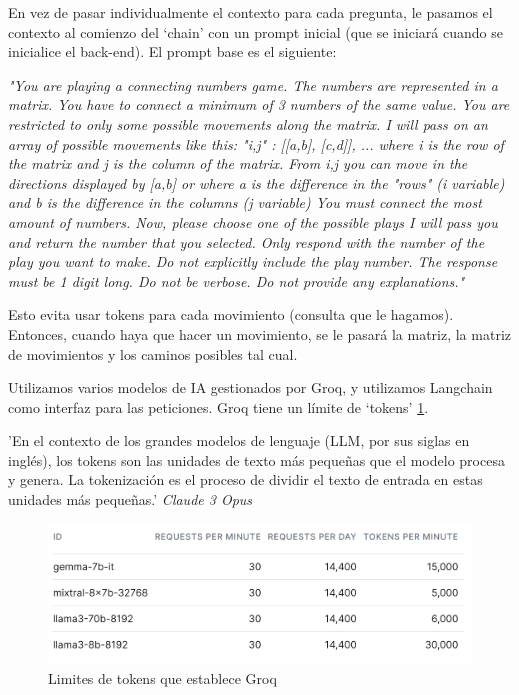 \documentclass[12pt,epsf,titlepage,a4paper]{article}
\begin{document}
En vez de pasar individualmente el contexto para cada pregunta, le pasamos el contexto al comienzo del ‘chain’ con un prompt inicial (que se iniciará cuando se inicialice el back-end). El prompt base es el siguiente:
\vspace{5mm}


\textit{"You are playing a connecting numbers game. The numbers are represented in a matrix.
You have to connect a minimum of 3 numbers of the same value.
You are restricted to only some possible movements along the matrix. 
I will pass on an array of possible movements like this: "i,j" : [[a,b], [c,d]], ... where i is the row of the matrix and j is the column of the matrix. From i,j you can move in the directions displayed by [a,b] or where a is the difference in the "rows" (i variable) and b is the difference in the columns (j variable)  
You must connect the most amount of numbers.
Now, please choose one of the possible plays I will pass you and return the number that you selected. 
Only respond with the number of the play you want to make. 
Do not explicitly include the play number. 
The response must be 1 digit long. 
Do not be verbose. 
Do not provide any explanations."}
\vspace{5mm}


Esto evita usar tokens para cada movimiento (consulta que le hagamos). Entonces, cuando haya que hacer un movimiento, se le pasará la matriz, la matriz de movimientos y los caminos posibles tal cual.

Utilizamos varios modelos de IA gestionados por Groq, y utilizamos Langchain como interfaz para las peticiones. Groq tiene un límite de ‘tokens’ \ref{groqtokens}.


\vspace{5mm}
'En el contexto de los grandes modelos de lenguaje (LLM, por sus siglas en inglés), los tokens son las unidades de texto más pequeñas que el modelo procesa y genera. La tokenización es el proceso de dividir el texto de entrada en estas unidades más pequeñas.' \textit{Claude 3 Opus}

\begin{figure}[h]
\centerline{\includegraphics[scale=0.15]{img/groq.png}}
\caption{Limites de tokens que establece Groq}
\label{groqtokens}
\end{figure}
\end{document}
